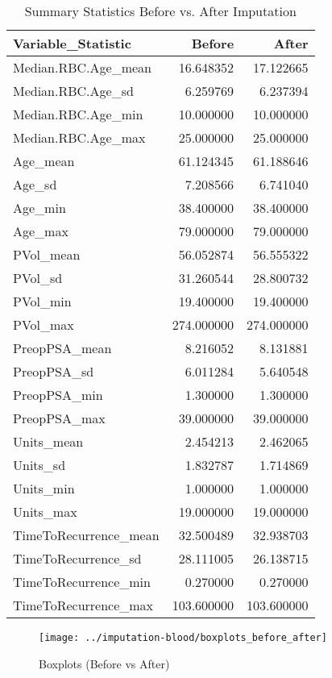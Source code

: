 \documentclass[
]{article}
\begin{document}
\begin{longtable}[t]{lrr}
\caption{\label{tab:compare-before-after}Summary Statistics Before vs. After Imputation}\\
\toprule
Variable\_Statistic & Before & After\\
\midrule
Median.RBC.Age\_mean & 16.648352 & 17.122665\\
Median.RBC.Age\_sd & 6.259769 & 6.237394\\
Median.RBC.Age\_min & 10.000000 & 10.000000\\
Median.RBC.Age\_max & 25.000000 & 25.000000\\
Age\_mean & 61.124345 & 61.188646\\
\addlinespace
Age\_sd & 7.208566 & 6.741040\\
Age\_min & 38.400000 & 38.400000\\
Age\_max & 79.000000 & 79.000000\\
PVol\_mean & 56.052874 & 56.555322\\
PVol\_sd & 31.260544 & 28.800732\\
\addlinespace
PVol\_min & 19.400000 & 19.400000\\
PVol\_max & 274.000000 & 274.000000\\
PreopPSA\_mean & 8.216052 & 8.131881\\
PreopPSA\_sd & 6.011284 & 5.640548\\
PreopPSA\_min & 1.300000 & 1.300000\\
\addlinespace
PreopPSA\_max & 39.000000 & 39.000000\\
Units\_mean & 2.454213 & 2.462065\\
Units\_sd & 1.832787 & 1.714869\\
Units\_min & 1.000000 & 1.000000\\
Units\_max & 19.000000 & 19.000000\\
\addlinespace
TimeToRecurrence\_mean & 32.500489 & 32.938703\\
TimeToRecurrence\_sd & 28.111005 & 26.138715\\
TimeToRecurrence\_min & 0.270000 & 0.270000\\
TimeToRecurrence\_max & 103.600000 & 103.600000\\
\bottomrule
\end{longtable}

\begin{figure}[H]

{\centering \texttt{[image: ../imputation-blood/boxplots\_before\_after]} 

}

\caption{Boxplots (Before vs After)}\label{fig:show-boxplot}
\end{figure}
\end{document}
